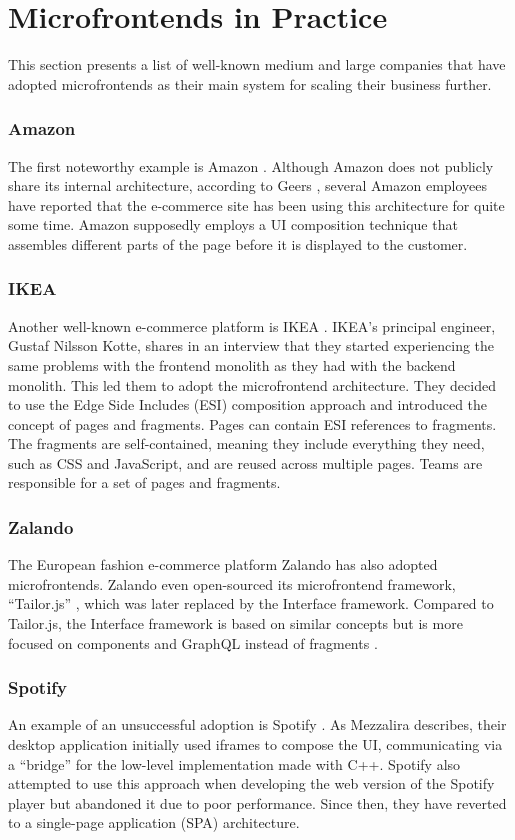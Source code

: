 \section{Microfrontends in Practice} This section presents a list of well-known medium and large companies that have adopted microfrontends as their main system for scaling their business further.

\subsubsection*{Amazon}
The first noteworthy example is Amazon \cite{Amazon}. Although Amazon does not publicly share its internal architecture, according to Geers \cite{Geers}, several Amazon employees have reported that the e-commerce site has been using this architecture for quite some time. Amazon supposedly employs a UI composition technique that assembles different parts of the page before it is displayed to the customer.

\subsubsection*{IKEA}
Another well-known e-commerce platform is IKEA \cite{IKEA}. IKEA's principal engineer, Gustaf Nilsson Kotte, shares in an interview \cite{StenbergIkea} that they started experiencing the same problems with the frontend monolith as they had with the backend monolith. This led them to adopt the microfrontend architecture. They decided to use the Edge Side Includes (ESI) composition approach and introduced the concept of pages and fragments. Pages can contain ESI references to fragments. The fragments are self-contained, meaning they include everything they need, such as CSS and JavaScript, and are reused across multiple pages. Teams are responsible for a set of pages and fragments.

\subsubsection*{Zalando}
The European fashion e-commerce platform Zalando \cite{Zalando} has also adopted microfrontends. Zalando even open-sourced its microfrontend framework, ``Tailor.js'' \cite{TailorJs}, which was later replaced by the Interface framework. Compared to Tailor.js, the Interface framework is based on similar concepts but is more focused on components and GraphQL instead of fragments \cite{MezzaliraBuildingMf}.

\subsubsection*{Spotify}
An example of an unsuccessful adoption is Spotify \cite{Spotify}. As Mezzalira \cite{MezzaliraBuildingMf} describes, their desktop application initially used iframes to compose the UI, communicating via a ``bridge'' for the low-level implementation made with C++. Spotify also attempted to use this approach when developing the web version of the Spotify player but abandoned it due to poor performance. Since then, they have reverted to a single-page application (SPA) architecture.

